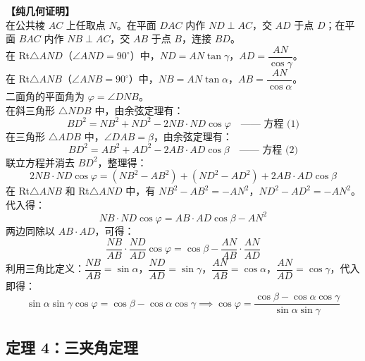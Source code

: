 \documentclass[11pt,a4paper]{ctexart}
\begin{document}
\noindent\textbf{【纯几何证明】}\\
在公共棱 $AC$ 上任取点 $N$。在平面 $DAC$ 内作 $ND \perp AC$，交 $AD$ 于点 $D$；在平面 $BAC$ 内作 $NB \perp AC$，交 $AB$ 于点 $B$，连接 $BD$。\\
在 Rt$\triangle AND$（$\angle AND = 90^\circ$）中，$ND = AN \tan\gamma$，$AD = \dfrac{AN}{\cos\gamma}$。\\
在 Rt$\triangle ANB$（$\angle ANB = 90^\circ$）中，$NB = AN \tan\alpha$，$AB = \dfrac{AN}{\cos\alpha}$。\\
二面角的平面角为 $\varphi = \angle DNB$。\\
在斜三角形 $\triangle NDB$ 中，由余弦定理有：
\[ BD^2 = NB^2 + ND^2 - 2 NB \cdot ND \cos\varphi \quad \text{—— 方程 (1)} \]
在三角形 $\triangle ADB$ 中，$\angle DAB = \beta$，由余弦定理有：
\[ BD^2 = AB^2 + AD^2 - 2 AB \cdot AD \cos\beta \quad \text{—— 方程 (2)} \]
联立方程并消去 $BD^2$，整理得：
\[ 2 NB \cdot ND \cos\varphi = (NB^2 - AB^2) + (ND^2 - AD^2) + 2 AB \cdot AD \cos\beta \]
在 Rt$\triangle ANB$ 和 Rt$\triangle AND$ 中，有 $NB^2 - AB^2 = -AN^2$，$ND^2 - AD^2 = -AN^2$。代入得：
\[ NB \cdot ND \cos\varphi = AB \cdot AD \cos\beta - AN^2 \]
两边同除以 $AB \cdot AD$，可得：
\[ \frac{NB}{AB} \cdot \frac{ND}{AD} \cos\varphi = \cos\beta - \frac{AN}{AB} \cdot \frac{AN}{AD} \]
利用三角比定义：$\dfrac{NB}{AB} = \sin\alpha$，$\dfrac{ND}{AD} = \sin\gamma$，$\dfrac{AN}{AB} = \cos\alpha$，$\dfrac{AN}{AD} = \cos\gamma$，代入即得：
\[ \sin\alpha \sin\gamma \cos\varphi = \cos\beta - \cos\alpha \cos\gamma \implies \boxed{\cos\varphi = \frac{\cos\beta - \cos\alpha \cos\gamma}{\sin\alpha \sin\gamma}} \]

\subsection{定理 4：三夹角定理}
\end{document}
